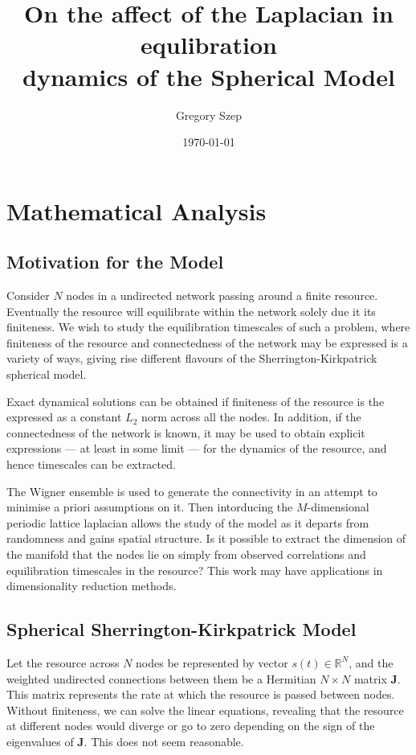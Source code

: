 \documentclass{article}[12pt]
\numberwithin{equation}{section}
\begin{document}
\title{
On the affect of the Laplacian in equlibration\\
dynamics of the Spherical Model
}

\author{Gregory Szep}
\date{\today}
\maketitle

\section{Mathematical Analysis}
\vspace{-10pt}
\subsection{Motivation for the Model}
Consider $N$ nodes in a undirected network passing around a finite resource.
Eventually the resource will equilibrate within the network solely due it its
finiteness. We wish to study the equilibration timescales of such a problem,
where finiteness of the resource and connectedness of the network may be
expressed is a variety of ways, giving rise different flavours of the
Sherrington-Kirkpatrick spherical model.

Exact dynamical solutions can be obtained if finiteness of the resource
is the expressed as a constant $L_2$ norm across all the nodes. In addition,
if the connectedness of the network is known, it may be used to obtain explicit
expressions --- at least in some limit --- for the dynamics of the resource,
and hence timescales can be extracted.

The Wigner ensemble is used to generate the connectivity in an attempt to
minimise a priori assumptions on it. Then intorducing the $M$-dimensional
periodic lattice laplacian allows the study of the model as it departs from
randomness and gains spatial structure. Is it possible to extract the dimension
of the manifold that the nodes lie on simply from observed correlations and
equilibration timescales in the resource? This work may have applications in
dimensionality reduction methods.

\subsection{Spherical Sherrington-Kirkpatrick Model}
Let the resource across $N$ nodes be represented by vector $s(t)\in\mathbb{R}^N$,
and the weighted undirected connections between them be a Hermitian $N\times N$ matrix
$\mathbf{J}$. This matrix represents the rate at which the resource is passed between
nodes. Without finiteness, we can solve the linear equations, revealing that
the resource at different nodes would diverge or go to zero depending on the sign
of the eigenvalues of $\mathbf{J}$. This does not seem reasonable.
\end{document}
